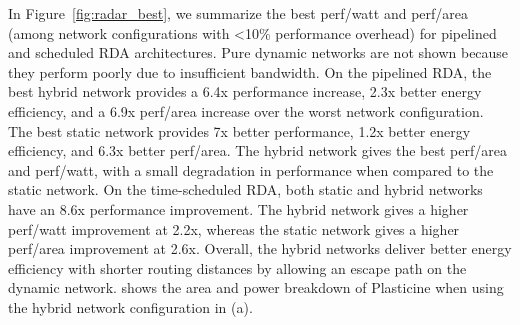 In Figure~\ref{fig:radar_best}, we summarize the best perf/watt and perf/area (among network configurations with <10\% performance overhead) for pipelined and scheduled RDA architectures. 
Pure dynamic networks are not shown because they perform poorly due to insufficient bandwidth.
On the pipelined RDA, the best hybrid network provides a 6.4x performance increase, 2.3x better energy efficiency, and a 6.9x perf/area increase over the worst network configuration. 
The best static network provides 7x better performance, 1.2x better energy efficiency, and 6.3x better perf/area. 
The hybrid network gives the best perf/area and perf/watt, with a small degradation in performance when compared to the static network. 
On the time-scheduled RDA, both static and hybrid networks have an 8.6x performance improvement. 
The hybrid network gives a higher perf/watt improvement at 2.2x, whereas the static network gives a higher perf/area improvement at 2.6x.
Overall, the hybrid networks deliver better energy efficiency with shorter routing distances by allowing an escape path on the dynamic network.
 shows the area and power breakdown of Plasticine when using the hybrid network
configuration in  (a).
